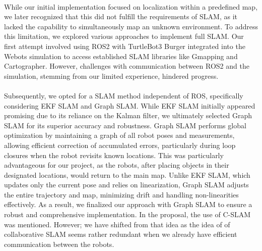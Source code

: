 \paragraph*{}
While our initial implementation focused on localization within a predefined map, we later recognized that this did not fulfill the requirements of SLAM, as it lacked the capability to simultaneously map an unknown environment. To address this limitation, we explored various approaches to implement full SLAM. Our first attempt involved using ROS2 with TurtleBot3 Burger integrated into the Webots simulation to access established SLAM libraries like Gmapping and Cartographer. However, challenges with communication between ROS2 and the simulation, stemming from our limited experience, hindered progress. 

\paragraph*{}Subsequently, we opted for a SLAM method independent of ROS, specifically considering EKF SLAM and Graph SLAM. While EKF SLAM initially appeared promising due to its reliance on the Kalman filter, we ultimately selected Graph SLAM for its superior accuracy and robustness. Graph SLAM performs global optimization by maintaining a graph of all robot poses and measurements, allowing efficient correction of accumulated errors, particularly during loop closures when the robot revisits known locations. This was particularly advantageous for our project, as the robots, after placing objects in their designated locations, would return to the main map. Unlike EKF SLAM, which updates only the current pose and relies on linearization, Graph SLAM adjusts the entire trajectory and map, minimizing drift and handling non-linearities effectively. As a result, we finalized our approach with Graph SLAM to ensure a robust and comprehensive implementation. In the proposal, the use of C-SLAM was mentioned. However; we have shifted from that idea as the idea of of collaborative SLAM seems rather redundant when we already have efficient communication between the robots. 
